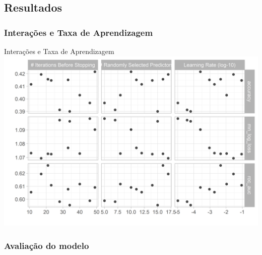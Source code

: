 \documentclass[
  9 pt,
  ignorenonframetext,
]{beamer}
\begin{document}
\hypertarget{resultados}{%
\subsection{Resultados}\label{resultados}}

\hypertarget{interauxe7uxf5es-e-taxa-de-aprendizagem}{%
\subsubsection{Interações e Taxa de
Aprendizagem}\label{interauxe7uxf5es-e-taxa-de-aprendizagem}}

\begin{frame}{Interações e Taxa de Aprendizagem}
\includegraphics{apresentacao_files/figure-beamer/unnamed-chunk-17-1.png}
\end{frame}

\hypertarget{avaliauxe7uxe3o-do-modelo}{%
\subsubsection{Avaliação do modelo}\label{avaliauxe7uxe3o-do-modelo}}
\end{document}
